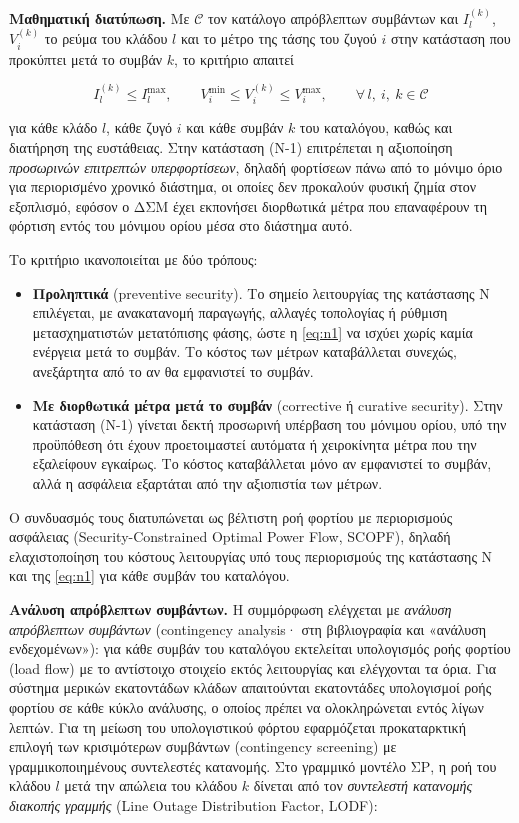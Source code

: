 \textbf{Μαθηματική διατύπωση.} Με $\mathcal{C}$ τον κατάλογο απρόβλεπτων συμβάντων και
$I_l^{(k)}$, $V_i^{(k)}$ το ρεύμα του κλάδου $l$ και το μέτρο της τάσης του ζυγού $i$ στην
κατάσταση που προκύπτει μετά το συμβάν $k$, το κριτήριο απαιτεί

\begin{equation}
I_l^{(k)} \le I_l^{\max}, \qquad V_i^{\min} \le V_i^{(k)} \le V_i^{\max},
\qquad \forall\, l,\ i,\ k \in \mathcal{C}
\label{eq:n1}
\end{equation}

για κάθε κλάδο $l$, κάθε ζυγό $i$ και κάθε συμβάν $k$ του καταλόγου, καθώς και διατήρηση της
ευστάθειας. Στην κατάσταση (N-1) επιτρέπεται η αξιοποίηση
\emph{προσωρινών επιτρεπτών υπερφορτίσεων}, δηλαδή φορτίσεων πάνω από το μόνιμο όριο για
περιορισμένο χρονικό διάστημα, οι οποίες δεν προκαλούν φυσική ζημία στον εξοπλισμό, εφόσον ο
ΔΣΜ έχει εκπονήσει διορθωτικά μέτρα που επαναφέρουν τη φόρτιση εντός του μόνιμου ορίου μέσα
στο διάστημα αυτό.

Το κριτήριο ικανοποιείται με δύο τρόπους:

\begin{itemize}
\item \textbf{Προληπτικά} (preventive security). Το σημείο λειτουργίας της κατάστασης N
      επιλέγεται, με ανακατανομή παραγωγής, αλλαγές τοπολογίας ή ρύθμιση μετασχηματιστών
      μετατόπισης φάσης, ώστε η \eqref{eq:n1} να ισχύει χωρίς καμία ενέργεια μετά το
      συμβάν. Το κόστος των μέτρων καταβάλλεται συνεχώς, ανεξάρτητα από το αν θα εμφανιστεί
      το συμβάν.
\item \textbf{Με διορθωτικά μέτρα μετά το συμβάν} (corrective ή curative security). Στην
      κατάσταση (N-1) γίνεται δεκτή προσωρινή υπέρβαση του μόνιμου ορίου, υπό την
      προϋπόθεση ότι έχουν προετοιμαστεί αυτόματα ή χειροκίνητα μέτρα που την εξαλείφουν
      εγκαίρως. Το κόστος καταβάλλεται μόνο αν εμφανιστεί το συμβάν, αλλά η ασφάλεια
      εξαρτάται από την αξιοπιστία των μέτρων.
\end{itemize}

Ο συνδυασμός τους διατυπώνεται ως βέλτιστη ροή φορτίου με περιορισμούς ασφάλειας
(Security-Constrained Optimal Power Flow, SCOPF), δηλαδή ελαχιστοποίηση του κόστους
λειτουργίας υπό τους περιορισμούς της κατάστασης N και της \eqref{eq:n1} για κάθε συμβάν του
καταλόγου.

\textbf{Ανάλυση απρόβλεπτων συμβάντων.} Η συμμόρφωση ελέγχεται με \emph{ανάλυση απρόβλεπτων
συμβάντων} (contingency analysis· στη βιβλιογραφία και «ανάλυση ενδεχομένων»): για κάθε
συμβάν του καταλόγου εκτελείται υπολογισμός ροής φορτίου (load flow) με το αντίστοιχο
στοιχείο εκτός λειτουργίας και ελέγχονται τα όρια. Για σύστημα μερικών εκατοντάδων κλάδων
απαιτούνται εκατοντάδες υπολογισμοί ροής φορτίου σε κάθε κύκλο ανάλυσης, ο οποίος πρέπει να
ολοκληρώνεται εντός λίγων λεπτών. Για τη μείωση του υπολογιστικού φόρτου εφαρμόζεται
προκαταρκτική επιλογή των κρισιμότερων συμβάντων (contingency screening) με γραμμικοποιημένους
συντελεστές κατανομής. Στο γραμμικό μοντέλο ΣΡ, η ροή του κλάδου $l$ μετά την απώλεια του
κλάδου $k$ δίνεται από τον \emph{συντελεστή κατανομής διακοπής γραμμής} (Line Outage
Distribution Factor, LODF):

